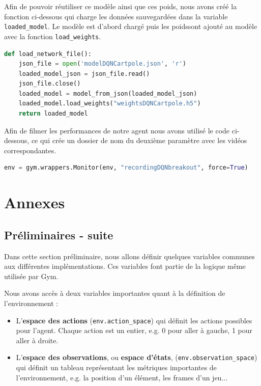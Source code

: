 \documentclass[10pt,a4paper]{article}
\begin{document}
Afin de pouvoir réutiliser ce modèle ainsi que ces poids, nous avons créé la fonction ci-dessous qui charge les données sauvegardées dans la variable \lstinline{loaded_model}. Le modèle est d'abord chargé puis les poidssont ajouté au modèle avec la fonction \lstinline{load_weights}.
\begin{lstlisting}[language=Python, caption=Chargement du réseau neuronal et de ses poids]
def load_network_file():
    json_file = open('modelDQNCartpole.json', 'r')
    loaded_model_json = json_file.read()
    json_file.close()
    loaded_model = model_from_json(loaded_model_json)
    loaded_model.load_weights("weightsDQNCartpole.h5")
    return loaded_model
\end{lstlisting}

Afin de filmer les performances de notre agent nous avons utilisé le code ci-dessous, ce qui crée un dossier de nom du deuxième paramètre avec les vidéos correspondantes.
\begin{lstlisting}[language=Python]
env = gym.wrappers.Monitor(env, "recordingDQNbreakout", force=True)
\end{lstlisting}


\section{Annexes} \label{annexes}

\subsection{Préliminaires - suite}

Dans cette section préliminaire, nous allons définir quelques variables communes aux différentes implémentations. Ces variables font partie de la logique même utilisée par Gym.

Nous avons accès à deux variables importantes quant à la définition de l'environnement :
\begin{itemize}
	\item L'\textbf{espace des actions} (\lstinline{env.action_space}) qui définit les actions possibles pour l'agent. Chaque action est un entier, e.g. 0 pour aller à gauche, 1 pour aller à droite.
	\item L'\textbf{espace des observations}, ou \textbf{espace d'états}, (\lstinline{env.observation_space}) qui définit un tableau représentant les métriques importantes de l'environnement, e.g. la position d'un élément, les frames d'un jeu...
\end{itemize}
\end{document}
